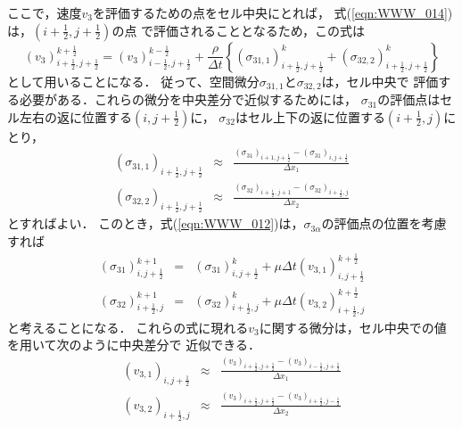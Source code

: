 ここで，速度$v_3$を評価するための点をセル中央にとれば，
式(\ref{eqn:WWW_014})は，$(i+\frac{1}{2}, j+\frac{1}{2})$の点
で評価されることとなるため，この式は
\begin{equation}
	(v_3)_{i+\frac{1}{2},j+\frac{1}{2}}^{k+\frac{1}{2}} 
	= 
	(v_3)_{i-\frac{1}{2},j+\frac{1}{2}}^{k-\frac{1}{2}} 
	+
	\frac{\rho}{\Delta t} \left\{
		(\sigma_{31,1})_{i+\frac{1}{2},j+\frac{1}{2}}^{k} 
		+
		(\sigma_{32,2})_{i+\frac{1}{2},j+\frac{1}{2}}^{k} 
	\right\} 
	\label{eqn:WWW_015}
\end{equation}
として用いることになる．
従って、空間微分$\sigma_{31,1}$と$\sigma_{32,2}$は，セル中央で
評価する必要がある．これらの微分を中央差分で近似するためには，
$\sigma_{31}$の評価点はセル左右の返に位置する$(i,j+\frac{1}{2})$に，
$\sigma_{32}$はセル上下の返に位置する$(i+\frac{1}{2},j)$にとり，
\begin{eqnarray}
	( \sigma_{31,1})_{i+\frac{1}{2}, j+\frac{1}{2}} 
	&\approx& 
	\frac{(\sigma_{31})_{i+1,j+\frac{1}{2}} - (\sigma_{31})_{i,j+\frac{1}{2}} }{\Delta x_1}
	\label{eqn:WWW_016}
	\\
	( \sigma_{32,2})_{i+\frac{1}{2}, j+\frac{1}{2}} 
	&\approx& 
	\frac{(\sigma_{32})_{i+\frac{1}{2},j+1} - (\sigma_{32})_{i+\frac{1}{2},j} }{\Delta x_2}
	\label{eqn:WWW_017}
\end{eqnarray}
とすればよい．
このとき，式(\ref{eqn:WWW_012})は，$\sigma_{3\alpha}$の評価点の位置を考慮すれば
\begin{eqnarray}
	(\sigma_{31})^{k+1}_{i,j+\frac{1}{2}} &=& 
	(\sigma_{31})^{k} _{i,j+\frac{1}{2}}
	+
	\mu \Delta t (v_{3,1})^{k+\frac{1}{2}}_{i,j+\frac{1}{2}}
	\label{eqn:WWW_018}
	\\
	(\sigma_{32})^{k+1}_{i+\frac{1}{2},j} &=& 
	(\sigma_{32})^{k}_{i+\frac{1}{2},j} 
	+
	\mu \Delta t (v_{3,2})^{k+\frac{1}{2}}_{i+\frac{1}{2},j}
	\label{eqn:WWW_019}
\end{eqnarray}
と考えることになる．
これらの式に現れる$v_3$に関する微分は，セル中央での値を用いて次のように中央差分で
近似できる．
\begin{eqnarray}
	(v_{3,1})_{i,j+\frac{1}{2}}
	&\approx & 
	\frac{
		(v_3)_{i+\frac{1}{2},j+\frac{1}{2}} 
		-
		(v_3)_{i-\frac{1}{2},j+\frac{1}{2}} 
	}{\Delta x_1}
	\label{eqn:WWW_020}
	\\
	(v_{3,2})_{i+\frac{1}{2},j}
	&\approx & 
	\frac{
		(v_3)_{i+\frac{1}{2},j+\frac{1}{2}} 
		-
		(v_3)_{i+\frac{1}{2},j-\frac{1}{2}} 
	}{\Delta x_2}
	\label{eqn:WWW_021}
\end{eqnarray}

